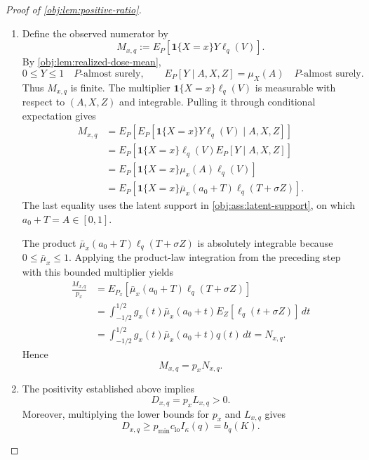 \documentclass[11pt]{article}
\begin{document}
\begin{proof}[Proof of \cref{obj:lem:positive-ratio}]
\begin{enumerate}
Since \(V=T+\sigma Z\), Fubini's theorem, justified by absolute integrability, and the pointwise Gaussian-inverse identity give
\[
\begin{aligned}
\frac{D_{x,q}}{p_x}
&=E_{P_x}[\ell_q(T+\sigma Z)]\\
&=\int_{-1/2}^{1/2}
g_x(t)E_Z[\ell_q(t+\sigma Z)]\,dt\\
&=\int_{-1/2}^{1/2}g_x(t)q(t)\,dt
=L_{x,q}.
\end{aligned}
\]
Consequently,
\[
D_{x,q}=p_xL_{x,q}.
\]

\item Define the observed numerator by
\[
M_{x,q}:=E_P[\mathbf1\{X=x\}Y\ell_q(V)].
\]
By \cref{obj:lem:realized-dose-mean},
\[
0\le Y\le1\quad P\text{-almost surely},
\qquad
E_P[Y\mid A,X,Z]=\mu_X(A)\quad P\text{-almost surely}.
\]
Thus \(M_{x,q}\) is finite. The multiplier
\(\mathbf1\{X=x\}\ell_q(V)\) is measurable with respect to \((A,X,Z)\) and integrable. Pulling it through conditional expectation gives
\[
\begin{aligned}
M_{x,q}
&=E_P\!\left[
E_P[\mathbf1\{X=x\}Y\ell_q(V)\mid A,X,Z]
\right]\\
&=E_P\!\left[
\mathbf1\{X=x\}\ell_q(V)E_P[Y\mid A,X,Z]
\right]\\
&=E_P[\mathbf1\{X=x\}\mu_x(A)\ell_q(V)]\\
&=E_P[\mathbf1\{X=x\}\bar\mu_x(a_0+T)\ell_q(T+\sigma Z)].
\end{aligned}
\]
The last equality uses the latent support in \cref{obj:ass:latent-support}, on which \(a_0+T=A\in[0,1]\).

The product \(\bar\mu_x(a_0+T)\ell_q(T+\sigma Z)\) is absolutely integrable because \(0\le\bar\mu_x\le1\). Applying the product-law integration from the preceding step with this bounded multiplier yields
\[
\begin{aligned}
\frac{M_{x,q}}{p_x}
&=E_{P_x}[\bar\mu_x(a_0+T)\ell_q(T+\sigma Z)]\\
&=\int_{-1/2}^{1/2}
g_x(t)\bar\mu_x(a_0+t)
E_Z[\ell_q(t+\sigma Z)]\,dt\\
&=\int_{-1/2}^{1/2}
g_x(t)\bar\mu_x(a_0+t)q(t)\,dt
=N_{x,q}.
\end{aligned}
\]
Hence
\[
M_{x,q}=p_xN_{x,q}.
\]

\item The positivity established above implies
\[
D_{x,q}=p_xL_{x,q}>0.
\]
Moreover, multiplying the lower bounds for \(p_x\) and \(L_{x,q}\) gives
\[
D_{x,q}
\ge p_{\min}c_{\mathrm{lo}}I_\kappa(q)
=b_q(K).
\]


\end{enumerate}
\end{proof}
\end{document}
